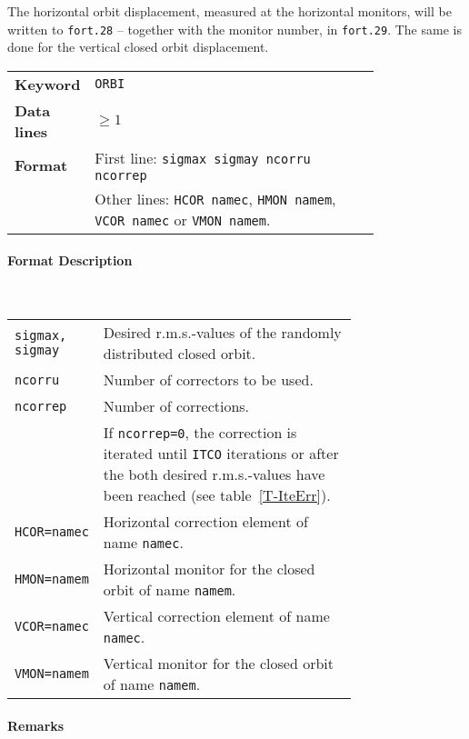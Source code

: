 The horizontal orbit displacement, measured at the horizontal monitors, will be written to \texttt{fort.28} -- together with the monitor number, in \texttt{fort.29}. The same is done for the vertical closed orbit displacement.

\bigskip
\begin{tabular}{@{}lp{0.8\linewidth}}
    \textbf{Keyword}    & \texttt{ORBI} \\
    \textbf{Data lines} & $\geq 1$ \\
    \textbf{Format}     & First line: \texttt{sigmax sigmay ncorru ncorrep} \\
                        & Other lines: \texttt{HCOR namec}, \texttt{HMON namem}, \texttt{VCOR namec} or \texttt{VMON namem}.\\
\end{tabular}

\paragraph{Format Description}~

\bigskip
\begin{longtabu}{@{}lp{0.75\linewidth}}
    \texttt{sigmax, sigmay} & Desired r.m.s.-values of the randomly distributed closed orbit. \\
    \texttt{ncorru}         & Number of correctors to be used. \\
    \texttt{ncorrep}        & Number of corrections. \\
                            & If \texttt{ncorrep=0}, the correction is iterated until \texttt{ITCO} iterations or after the both desired r.m.s.-values have been reached (see table~\ref{T-IteErr}). \\
    \texttt{HCOR=namec}     & Horizontal correction element of name \texttt{namec}. \\
    \texttt{HMON=namem}     & Horizontal monitor for the closed orbit of name \texttt{namem}. \\
    \texttt{VCOR=namec}     & Vertical correction element of name \texttt{namec}. \\
    \texttt{VMON=namem}     & Vertical monitor for the closed orbit of name \texttt{namem}.
\end{longtabu}

\paragraph{Remarks}~


